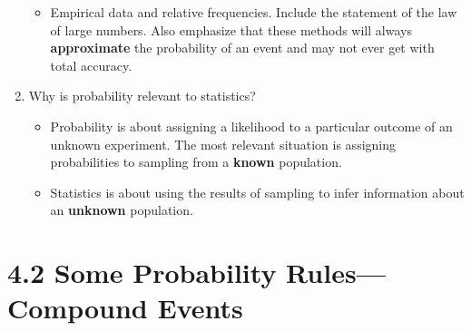 \documentclass{article}
\begin{document}
\begin{enumerate}
\begin{itemize}
            
            \item Empirical data and relative frequencies. Include the statement of the law of large numbers. Also emphasize that these methods will always \textbf{approximate} the probability of an event and may not ever get with total accuracy.
            
        \end{itemize}
        
    \item Why is probability relevant to statistics?
    
        \begin{itemize}
        
            \item Probability is about assigning a likelihood to a particular outcome of an unknown experiment. The most relevant situation is assigning probabilities to sampling from a \textbf{known} population.
            
            \item Statistics is about using the results of sampling to infer information about an \textbf{unknown} population.
            
        \end{itemize}
    
\end{enumerate}

\newpage

\section*{4.2 Some Probability Rules---Compound Events}
\end{document}
